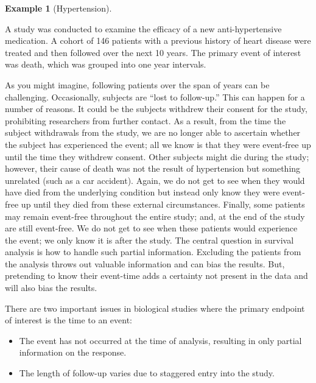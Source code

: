 \documentclass[
  letterpaper,
  DIV=11,
  numbers=noendperiod]{scrreprt}
\providecommand{\tightlist}{%
  \setlength{\itemsep}{0pt}\setlength{\parskip}{0pt}}\usepackage{longtable,booktabs,array}
\theoremstyle{definition}
\theoremstyle{definition}
\newtheorem{example}{Example}[chapter]
\theoremstyle{remark}
\begin{document}
\begin{example}[Hypertension]\protect\hypertarget{exm-surv-hypertension}{}\label{exm-surv-hypertension}

A study was conducted to examine the efficacy of a new anti-hypertensive
medication. A cohort of 146 patients with a previous history of heart
disease were treated and then followed over the next 10 years. The
primary event of interest was death, which was grouped into one year
intervals.

\end{example}

As you might imagine, following patients over the span of years can be
challenging. Occasionally, subjects are ``lost to follow-up.'' This can
happen for a number of reasons. It could be the subjects withdrew their
consent for the study, prohibiting researchers from further contact. As
a result, from the time the subject withdrawals from the study, we are
no longer able to ascertain whether the subject has experienced the
event; all we know is that they were event-free up until the time they
withdrew consent. Other subjects might die during the study; however,
their cause of death was not the result of hypertension but something
unrelated (such as a car accident). Again, we do not get to see when
they would have died from the underlying condition but instead only know
they were event-free up until they died from these external
circumstances. Finally, some patients may remain event-free throughout
the entire study; and, at the end of the study are still event-free. We
do not get to see when these patients would experience the event; we
only know it is after the study. The central question in survival
analysis is how to handle such partial information. Excluding the
patients from the analysis throws out valuable information and can bias
the results. But, pretending to know their event-time adds a certainty
not present in the data and will also bias the results.

There are two important issues in biological studies where the primary
endpoint of interest is the time to an event:

\begin{itemize}
\tightlist
\item
  The event has not occurred at the time of analysis, resulting in only
  partial information on the response.
\item
  The length of follow-up varies due to staggered entry into the study.
\end{itemize}
\end{document}
